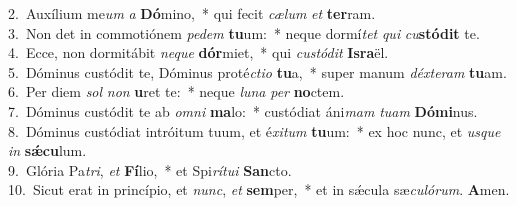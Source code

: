 {2.~}Auxílium me\textit{um} \textit{a} \textbf{Dó}mino,~* qui fecit \textit{cæ}\textit{lum} \textit{et} \textbf{ter}ram.\\
{3.~}Non det in commotiónem \textit{pe}\textit{dem} \textbf{tu}um:~* neque dormí\textit{tet} \textit{qui} \textit{cu}\textbf{stó}\textbf{dit} te.\\
{4.~}Ecce, non dormitábit \textit{ne}\textit{que} \textbf{dór}miet,~* qui \textit{cu}\textit{stó}\textit{dit} \textbf{Is}\textbf{ra}ël.\\
{5.~}Dóminus custódit te, Dóminus proté\textit{cti}\textit{o} \textbf{tu}a,~* super manum \textit{déx}\textit{te}\textit{ram} \textbf{tu}am.\\
{6.~}Per diem \textit{sol} \textit{non} \textbf{u}ret te:~* neque \textit{lu}\textit{na} \textit{per} \textbf{no}ctem.\\
{7.~}Dóminus custódit te ab \textit{om}\textit{ni} \textbf{ma}lo:~* custódiat áni\textit{mam} \textit{tu}\textit{am} \textbf{Dó}\textbf{mi}nus.\\
{8.~}Dóminus custódiat intróitum tuum, et é\textit{xi}\textit{tum} \textbf{tu}um:~* ex hoc nunc, et \textit{us}\textit{que} \textit{in} \textbf{sǽ}\textbf{cu}lum.\\
{9.~}Glória Pa\textit{tri}, \textit{et} \textbf{Fí}lio,~* et Spi\textit{rí}\textit{tu}\textit{i} \textbf{San}cto.\\
{10.~}Sicut erat in princípio, et \textit{nunc}, \textit{et} \textbf{sem}per,~* et in sǽcula sæ\textit{cu}\textit{ló}\textit{rum}. \textbf{A}men.\\

